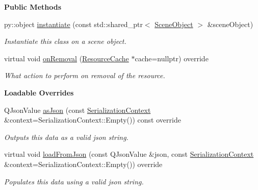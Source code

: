 \begin{Indent}\textbf{ Public Methods}\par
\begin{DoxyCompactItemize}
\item 
py\+::object \mbox{\hyperlink{classrev_1_1_python_class_script_a14a31154d6bc1d2ac782ab5f24f7f40b}{instantiate}} (const std\+::shared\+\_\+ptr$<$ \mbox{\hyperlink{classrev_1_1_scene_object}{Scene\+Object}} $>$ \&scene\+Object)
\begin{DoxyCompactList}\small\item\em Instantiate this class on a scene object. \end{DoxyCompactList}\item 
\mbox{\label{classrev_1_1_python_class_script_a453ce50a878c43a86b0a4a0992a85f1b}} 
virtual void \mbox{\hyperlink{classrev_1_1_python_class_script_a453ce50a878c43a86b0a4a0992a85f1b}{on\+Removal}} (\mbox{\hyperlink{classrev_1_1_resource_cache}{Resource\+Cache}} $\ast$cache=nullptr) override
\begin{DoxyCompactList}\small\item\em What action to perform on removal of the resource. \end{DoxyCompactList}\end{DoxyCompactItemize}
\end{Indent}
\begin{Indent}\textbf{ Loadable Overrides}\par
\begin{DoxyCompactItemize}
\item 
\mbox{\label{classrev_1_1_python_class_script_aaab0dffde2c7263c2cc999502d29b688}} 
Q\+Json\+Value \mbox{\hyperlink{classrev_1_1_python_class_script_aaab0dffde2c7263c2cc999502d29b688}{as\+Json}} (const \mbox{\hyperlink{structrev_1_1_serialization_context}{Serialization\+Context}} \&context=Serialization\+Context\+::\+Empty()) const override
\begin{DoxyCompactList}\small\item\em Outputs this data as a valid json string. \end{DoxyCompactList}\item 
\mbox{\label{classrev_1_1_python_class_script_aa2c2dee87f2da0fecd8cfdf88c950c90}} 
virtual void \mbox{\hyperlink{classrev_1_1_python_class_script_aa2c2dee87f2da0fecd8cfdf88c950c90}{load\+From\+Json}} (const Q\+Json\+Value \&json, const \mbox{\hyperlink{structrev_1_1_serialization_context}{Serialization\+Context}} \&context=Serialization\+Context\+::\+Empty()) override
\begin{DoxyCompactList}\small\item\em Populates this data using a valid json string. \end{DoxyCompactList}\end{DoxyCompactItemize}
\end{Indent}
